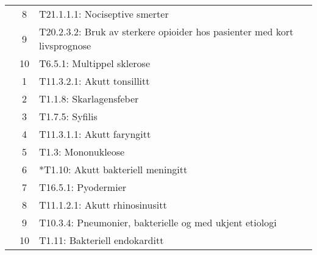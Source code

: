 \documentclass[a4paper, 11pt]{article}
\begin{document}
\begin{table}[htbp]
\begin{tabularx}{\textwidth}{c c X}
	 & 8 & T21.1.1.1: Nociseptive smerter \\
	 & 9 & T20.2.3.2: Bruk av sterkere opioider hos pasienter med kort livsprognose \\
	 & 10 & T6.5.1: Multippel sklerose \\
	\addlinespace
	8 & 1 & T11.3.2.1: Akutt tonsillitt \\
	 & 2 & T1.1.8: Skarlagensfeber \\
	 & 3 & T1.7.5: Syfilis \\
	 & 4 & T11.3.1.1: Akutt faryngitt \\
	 & 5 & T1.3: Mononukleose \\
	 & 6 & *T1.10: Akutt bakteriell meningitt \\
	 & 7 & T16.5.1: Pyodermier \\
	 & 8 & T11.1.2.1: Akutt rhinosinusitt \\
	 & 9 & T10.3.4: Pneumonier, bakterielle og med ukjent etiologi \\
	 & 10 & T1.11: Bakteriell endokarditt \\
	\bottomrule
\end{tabularx}
\end{table}
\end{document}
